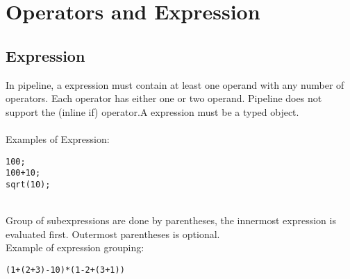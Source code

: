 \documentclass[./LRM_main.tex]{subfiles}
\begin{document}


\chapter{Operators and Expression}
\section{Expression}
In pipeline, a expression must contain at least one operand with any number of operators. Each operator has either one or two operand. Pipeline does not support the (inline if) operator.A expression must be a typed object.\\ 
\vspace{1mm}\\
Examples of Expression:\\
\begin{lstlisting}
100;
100+10;
sqrt(10);
\end{lstlisting}
\vspace{5mm}\\
Group of subexpressions are done by parentheses, the innermost expression is evaluated first. Outermost parentheses is optional.\\
Example of expression grouping:
\begin{lstlisting}
(1+(2+3)-10)*(1-2+(3+1))
\end{lstlisting}
\end{document}
